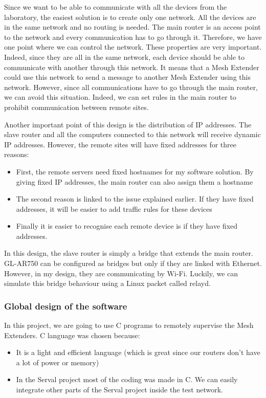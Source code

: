 Since we want to be able to communicate with all the devices from the laboratory, the easiest solution is to create only one network. All the devices are in the same network and no routing is needed. The main router is an access point to the network and every communication has to go through it. Therefore, we have one point where we can control the network. These properties are very important. Indeed, since they are all in the same network, each device should be able to communicate with another through this network. It means that a Mesh Extender could use this network to send a message to another Mesh Extender using this network. However, since all communications have to go through the main router, we can avoid this situation. Indeed, we can set rules in the main router to prohibit communication between remote sites.

Another important point of this design is the distribution of IP addresses. The slave router and all the computers connected to this network will receive dynamic IP addresses. However, the remote sites will have fixed addresses for three reasons:
\begin{itemize}
	\item First, the remote servers need fixed hostnames for my software solution. By giving fixed IP addresses, the main router can also assign them a hostname
	\item The second reason is linked to the issue explained earlier. If they have fixed addresses, it will be easier to add traffic rules for these devices
	\item Finally it is easier to recognise each remote device is if they have fixed addresses.
\end{itemize}

In this design, the slave router is simply a bridge that extends the main router. GL-AR750 can be configured as bridges but only if they are linked with Ethernet. However, in my design, they are communicating by Wi-Fi. Luckily, we can simulate this bridge behaviour using a Linux packet called relayd.




\subsubsection{Global design of the software}

In this project, we are going to use C programs to remotely supervise the Mesh Extenders.
C language was chosen because:
\begin{itemize}
	\item It is a light and efficient language (which is great since our routers don't have a lot of power or memory)
	\item In the Serval project most of the coding was made in C. We can easily integrate other parts of the Serval project inside the test network.
\end{itemize}


